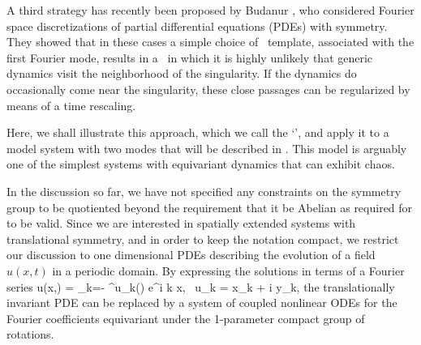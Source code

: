 A third strategy has recently been proposed by Budanur
\etal{}, who considered Fourier space discretizations of
partial differential equations (PDEs) with  symmetry. They showed
that in these cases a simple choice of \slice\ template, associated with
the first Fourier mode, results in a \slice\ in which it is highly
unlikely that generic dynamics visit the neighborhood of the singularity.
If the dynamics do occasionally come near the singularity, these close
passages can be regularized by means of a time rescaling.

Here, we shall illustrate this approach, which we call the `\fFslice',
and apply it to a model system with two modes that will be described in .
This model is arguably one of the simplest systems with  equivariant dynamics that can
exhibit chaos.

In the discussion so far, we have not specified any constraints on the symmetry group
to be quotiented beyond the requirement that it be Abelian as required for 
to be valid. Since we are interested in spatially extended systems with
translational symmetry, and in order to keep the notation compact,
we restrict our discussion to one dimensional PDEs describing
the evolution of a field $u(x,t)$ in a periodic domain.
By expressing the solutions in terms of a Fourier series
\beq
   u(x,\zeit) = \sum\limits_{k=- \infty}^\infty u_k\left(\zeit\right) e^{i k x}, \,\,\,u_k = x_k + i y_k,
the translationally invariant PDE can be replaced by a system of coupled nonlinear
ODEs for the Fourier coefficients equivariant under the 1-parameter compact group of  rotations.

